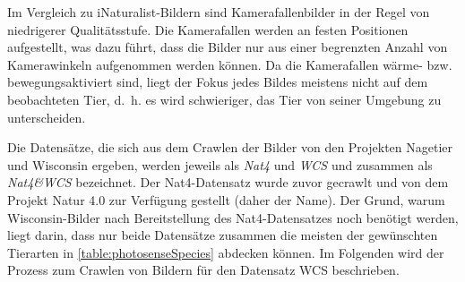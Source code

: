 Im Vergleich zu iNaturalist-Bildern sind Kamerafallenbilder in der Regel von niedrigerer Qualitätsstufe. Die Kamerafallen werden an festen Positionen aufgestellt, was dazu führt, dass die Bilder nur aus einer begrenzten Anzahl von Kamerawinkeln aufgenommen werden können. Da die Kamerafallen wärme- bzw. bewegungsaktiviert sind, liegt der Fokus jedes Bildes meistens nicht auf dem beobachteten Tier, d.~h. es wird schwieriger, das Tier von seiner Umgebung zu unterscheiden.

Die Datensätze, die sich aus dem Crawlen der Bilder von den Projekten Nagetier und Wisconsin ergeben, werden jeweils als \emph{Nat4} und \emph{WCS} und zusammen als \emph{Nat4\&WCS} bezeichnet. Der Nat4-Datensatz wurde zuvor gecrawlt und von dem Projekt Natur 4.0 zur Verfügung gestellt (daher der Name). Der Grund, warum Wisconsin-Bilder nach Bereitstellung des Nat4-Datensatzes noch benötigt werden, liegt darin, dass nur beide Datensätze zusammen die meisten der gewünschten Tierarten in \autoref{table:photosenseSpecies} abdecken können. Im Folgenden wird der Prozess zum Crawlen von Bildern für den Datensatz WCS beschrieben.

